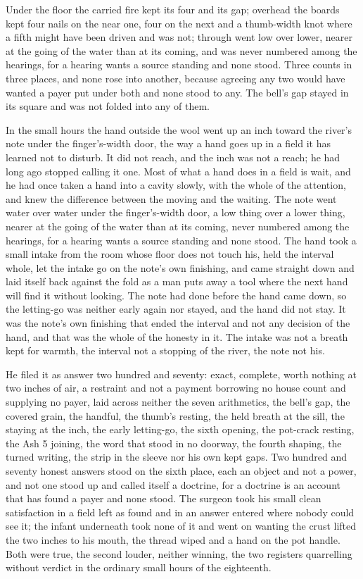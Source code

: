Under the floor the carried fire kept its four and its gap; overhead the boards kept four nails on the near one, four on the next and a thumb-width knot where a fifth might have been driven and was not; through   went low over lower, nearer at the going of the water than at its coming, and was never numbered among the hearings, for a hearing wants a source standing and none stood. Three counts in three places, and none rose into another, because agreeing any two would have wanted a payer put under both and none stood to any. The bell's gap stayed in its square and was not folded into any of them.

\scenebreak

In the small hours the hand outside the wool went up an inch toward the river's note under the finger's-width door, the way a hand goes up in a field it has learned not to disturb. It did not reach, and the inch was not a reach; he had long ago stopped calling it one. Most of what a hand does in a field is wait, and he had once taken a hand into a cavity slowly, with the whole of the attention, and knew the difference between the moving and the waiting. The note went water over water under the finger's-width door, a low thing over a lower thing, nearer at the going of the water than at its coming, never numbered among the hearings, for a hearing wants a source standing and none stood. The hand took a small intake from the room whose floor does not touch his, held the interval whole, let the intake go on the note's own finishing, and came straight down and laid itself back against the fold as a man puts away a tool where the next hand will find it without looking. The note had done before the hand came down, so the letting-go was neither early again nor stayed, and the hand did not stay. It was the note's own finishing that ended the interval and not any decision of the hand, and that was the whole of the honesty in it. The intake was not a breath kept for warmth, the interval not a stopping of the river, the note not his.

He filed it as answer two hundred and seventy: exact, complete, worth nothing at two inches of air, a restraint and not a payment borrowing no house count and supplying no payer, laid across neither the seven arithmetics, the bell's gap, the covered grain, the handful, the thumb's resting, the held breath at the sill, the staying at the inch, the early letting-go, the sixth opening, the pot-crack resting, the Ash 5 joining, the word that stood in no doorway, the fourth shaping, the turned writing, the strip in the sleeve nor his own kept gaps. Two hundred and seventy honest answers stood on the sixth place, each an object and not a power, and not one stood up and called itself a doctrine, for a doctrine is an account that has found a payer and none stood. The surgeon took his small clean satisfaction in a field left as found and in an answer entered where nobody could see it; the infant underneath took none of it and went on wanting the crust lifted the two inches to his mouth, the thread wiped and a hand on the pot handle. Both were true, the second louder, neither winning, the two registers quarrelling without verdict in the ordinary small hours of the eighteenth.

